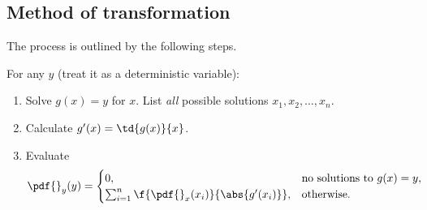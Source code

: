 \subsection{Method of transformation}
The process is outlined by the following steps. 

\begin{myBlackBox}
    For any $y$ (treat it as a deterministic variable):
    \begin{enumerate}
        \item Solve $g(x)=y$ for $x$. List \emph{all} possible solutions $x_{1},x_{2},\ldots,x_{n}$.
        \item Calculate $g'(x) = \td{g(x)}{x}$.
        \item Evaluate 
        \begin{align}
            \pdf{}_{y}(y) 
            &= 
            \begin{cases}
                0, &\text{no solutions to }g(x)=y,\\
                \sum_{i=1}^{n} \f{\pdf{}_{x}(x_{i})}{\abs{g'(x_{i})}}, &\text{otherwise}.
            \end{cases}
        \end{align}
    \end{enumerate}
\end{myBlackBox}

